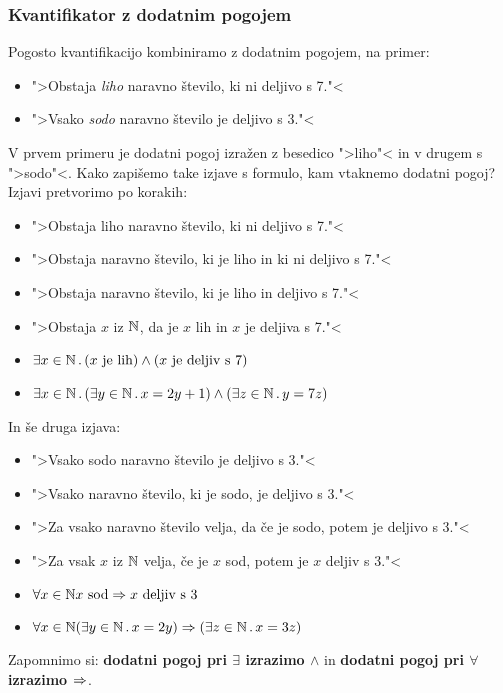\subsubsection{Kvantifikator z dodatnim pogojem}

Pogosto kvantifikacijo kombiniramo z dodatnim pogojem, na primer:
%
\begin{itemize}
\item ">Obstaja \emph{liho} naravno število, ki ni deljivo s 7."<
\item ">Vsako \emph{sodo} naravno število je deljivo s 3."<
\end{itemize}
%
V prvem primeru je dodatni pogoj izražen z besedico ">liho"< in v drugem s ">sodo"<. Kako zapišemo take izjave s formulo, kam
vtaknemo dodatni pogoj? Izjavi pretvorimo po korakih:
%
\begin{itemize}
\item ">Obstaja liho naravno število, ki ni deljivo s 7."<
\item ">Obstaja naravno število, ki je liho in ki ni deljivo s 7."<
\item ">Obstaja naravno število, ki je liho in deljivo s 7."<
\item ">Obstaja $x$ iz $\mathbb{N}$, da je $x$ lih in $x$ je deljiva s 7."<
\item $\exists x \in \mathbb{N} \,.\, (\text{$x$ je lih}) \land (\text{$x$ je deljiv s 7})$
\item $\exists x \in \mathbb{N} \,.\, (\exists y \in \mathbb{N} \,.\, x = 2 y + 1) \land (\exists z \in \mathbb{N} \,.\, y = 7 z)$
\end{itemize}
%
In še druga izjava:
\begin{itemize}
\item ">Vsako sodo naravno število je deljivo s 3."<
\item ">Vsako naravno število, ki je sodo, je deljivo s 3."<
\item ">Za vsako naravno število velja, da če je sodo, potem je deljivo s 3."<
\item ">Za vsak $x$ iz $\mathbb{N}$ velja, če je $x$ sod, potem je $x$ deljiv s $3$."<
\item $\forall{x \in \mathbb{N}} \text{$x$ sod} \Rightarrow \text{$x$ deljiv s 3}$
\item $\forall{x \in \mathbb{N}} (\exists y \in \mathbb{N} \,.\, x = 2 y) \Rightarrow (\exists z \in \mathbb{N} \,.\, x = 3 z)$
\end{itemize}
%
Zapomnimo si: \textbf{dodatni pogoj pri $\exists$ izrazimo $\land$} in \textbf{dodatni pogoj pri $\forall$ izrazimo $\Rightarrow$}.

